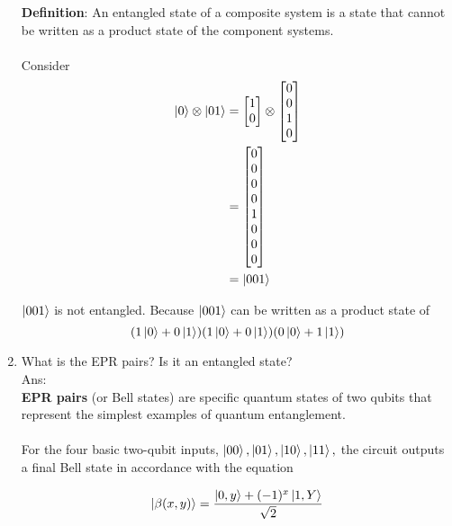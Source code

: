 \documentclass[12pt, a4paper]{article}
\begin{document}
\begin{enumerate}
	\textbf{Definition}: An entangled state of a composite system is a state that cannot be written as a product state of the component systems.\\\\
	Consider
	\begin{align*}
		\ket{0}\otimes \ket{01} &= \begin{bmatrix}
													1\\
													0
												\end{bmatrix}
											\otimes
											\begin{bmatrix}
												0\\
												0\\
												1\\
												0
											\end{bmatrix}\\
										&= \begin{bmatrix}
											0\\
											0\\
											0\\
											0\\
											1\\
											0\\
											0\\
											0
										\end{bmatrix}\\
									&= \ket{001}
	\end{align*}

	$\ket{001}$ is not entangled. Because $\ket{001}$ can be written as a product state of
	$$(1\ket{0} + 0\ket{1})(1\ket{0} + 0\ket{1})(0\ket{0} + 1\ket{1})$$
	\item What is the EPR pairs? Is it an entangled state?\\
	Ans:\\
	\textbf{EPR pairs} (or Bell states) are specific quantum states of two qubits that represent the simplest examples of quantum entanglement.\\\\
	
	For the four basic two-qubit inputs, $\ket{00}, \ket{01}, \ket{10}, \ket{11},$ the circuit outputs a final Bell state in accordance with the equation
	
	\begin{equation*}
		\ket{\beta(x, y)} = \frac{\ket{0, y} + (-1)^x\ket{1, Y}}{\sqrt{2}}
	\end{equation*}


\end{enumerate}
\end{document}
